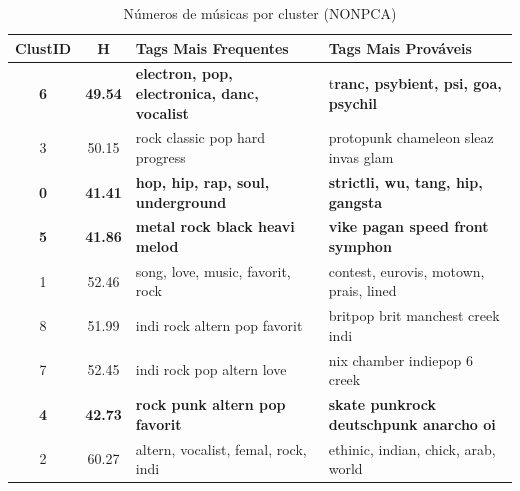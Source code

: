 \documentclass[brazil,a4paper,12pt]{article}
\begin{document}
\begin{table}
\centering
\small
\begin{tabular}{cc|l|l}
\toprule
ClustID & H & Tags Mais Frequentes & Tags Mais Prováveis \\
\midrule
\textbf{6}	& \textbf{49.54} & \textbf{electron, pop, electronica, danc, vocalist} & t\textbf{ranc, psybient, psi, goa, psychil} \\
3	& 50.15 &          rock
         classic
         pop
         hard
         progress &          protopunk
         chameleon
         sleaz
         invas
         glam  \\
\textbf{0}	& \textbf{41.41} & \textbf{hop, hip, rap, soul, underground} & \textbf{strictli, wu, tang, hip, gangsta}  \\
\textbf{5}	& \textbf{41.86} &          \textbf{metal
         rock
         black
         heavi
         melod}
 &       \textbf{vike
         pagan
         speed
         front
         symphon}
 \\
1	& 52.46 & song, love, music, favorit, rock & contest, eurovis, motown, prais, lined  \\
8	& 51.99 &          indi
         rock
         altern
         pop
         favorit &          britpop
         brit
         manchest
         creek
         indi  \\
7	& 52.45 &          indi
         rock
         pop
         altern
         love & nix
         chamber
         indiepop
         6
         creek  \\
\textbf{4}	& \textbf{42.73} & \textbf{rock
         punk
         altern
         pop
         favorit} & \textbf{skate
         punkrock
         deutschpunk
         anarcho
         oi}  \\
2	& 60.27 & altern, vocalist, femal, rock, indi & ethinic, indian, chick, arab, world  \\
\bottomrule
\end{tabular}
\caption{Números de músicas por cluster (NONPCA)}
\label{tab:hnonpca}
\end{table}
\end{document}
